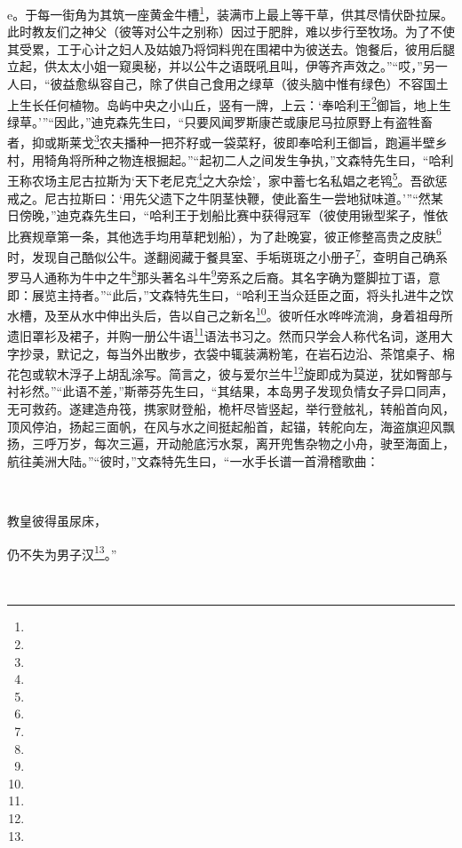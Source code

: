e{}。于每一街角为其筑一座黄金牛槽\footnote{}，装满市上最上等干草，供其尽情伏卧拉屎。此时教友们之神父（彼等对公牛之别称）因过于肥胖，难以步行至牧场。为了不使其受累，工于心计之妇人及姑娘乃将饲料兜在围裙中为彼送去。饱餐后，彼用后腿立起，供太太小姐一窥奥秘，并以公牛之语既吼且叫，伊等齐声效之。”“哎，”另一人曰，“彼益愈纵容自己，除了供自己食用之绿草（彼头脑中惟有绿色）不容国土上生长任何植物。岛屿中央之小山丘，竖有一牌，上云：‘奉哈利王\footnote{}御旨，地上生绿草。’”“因此，”迪克森先生曰，“只要风闻罗斯康芒或康尼马拉原野上有盗牲畜者，抑或斯莱戈\footnote{}农夫播种一把芥籽或一袋菜籽，彼即奉哈利王御旨，跑遍半壁乡村，用犄角将所种之物连根掘起。”“起初二人之间发生争执，”文森特先生曰，“哈利王称农场主尼古拉斯为‘天下老尼克\footnote{}之大杂烩’，家中蓄七名私娼之老鸨\footnote{}。吾欲惩戒之。尼古拉斯曰：‘用先父遗下之牛阴茎快鞭，使此畜生一尝地狱味道。’”“然某日傍晚，”迪克森先生曰，“哈利王于划船比赛中获得冠军（彼使用锹型桨子，惟依比赛规章第一条，其他选手均用草耙划船），为了赴晚宴，彼正修整高贵之皮肤\footnote{}时，发现自己酷似公牛。遂翻阅藏于餐具室、手垢斑斑之小册子\footnote{}，查明自己确系罗马人通称为牛中之牛\footnote{}那头著名斗牛\footnote{}旁系之后裔。其名字确为蹩脚拉丁语，意即：展览主持者。”“此后，”文森特先生曰，“哈利王当众廷臣之面，将头扎进牛之饮水槽，及至从水中伸出头后，告以自己之新名\footnote{}。彼听任水哗哗流淌，身着祖母所遗旧罩衫及裙子，并购一册公牛语\footnote{}语法书习之。然而只学会人称代名词，遂用大字抄录，默记之，每当外出散步，衣袋中辄装满粉笔，在岩石边沿、茶馆桌子、棉花包或软木浮子上胡乱涂写。简言之，彼与爱尔兰牛\footnote{}旋即成为莫逆，犹如臀部与衬衫然。”“此语不差，”斯蒂芬先生曰，“其结果，本岛男子发现负情女子异口同声，无可救药。遂建造舟筏，携家财登船，桅杆尽皆竖起，举行登舷礼，转船首向风，顶风停泊，扬起三面帆，在风与水之间挺起船首，起锚，转舵向左，海盗旗迎风飘扬，三呼万岁，每次三遍，开动舱底污水泵，离开兜售杂物之小舟，驶至海面上，航往美洲大陆。”“彼时，”文森特先生曰，“一水手长谱一首滑稽歌曲：
\par  
\par 教皇彼得虽尿床，
\par 仍不失为男子汉\footnote{}。”
\par  
